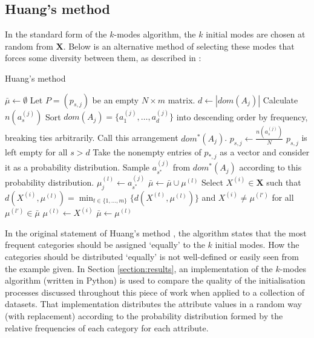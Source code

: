 \documentclass{article}
\theoremstyle{definition}
\begin{document}
\subsection{Huang's method}\label{subsection:huang}

In the standard form of the $k$-modes algorithm, the $k$ initial modes are 
chosen at random from $\textbf{X}$. Below is an alternative method of selecting
these modes that forces some diversity between them, as described in 
\cite{Huang98}:

\begin{algorithm}[H]
\caption{Huang's method}\label{alg:huang}
	\begin{algorithmic}[0]
		\State $\bar{\mu} \gets \emptyset$
		\State Let $P = (p_{s,j})$ be an empty $N \times m$ matrix.
			\State $d \gets |dom(A_j)|$
				\State Calculate $n(a_s^{(j)})$
			\EndFor
			\State Sort $dom(A_j) = \{a_1^{(j)}, \ldots, 
				a_d^{(j)}\}$ into descending order by frequency,
				breaking ties arbitrarily.
			\State Call this arrangement $dom^*(A_j)$.
				\State $p_{s,j} \gets \frac{n(a_s^{(j)})}{N}$
			\EndFor
			\State $p_{s,j}$ is left empty for all $s > d$
		\EndFor
				\State Take the nonempty entries of $p_{*,j}$ 
					as a vector and consider it as a 
					probability distribution.
				\State Sample $a_{s^*}^{(j)}$ from $dom^*(A_j)$
					according to this probability 
					distribution.
				\State $\mu_j^{(l)} \gets a_{s^*}^{(j)}$
			\EndFor
			\State $\bar{\mu} \gets \bar{\mu} \cup \mu^{(l)}$
		\EndFor
			\State Select $X^{(i)} \in \textbf{X}$ such that 
				$d(X^{(i)}, \mu^{(l)}) = \min_{t \in \{1, 
				\ldots, m\}} \{d(X^{(t)}, \mu^{(l)})\}$ and 
				$X^{(i)} \ne \mu^{(l')}$ for all $\mu^{(l')} 
				\in \bar{\mu}$
			\State $\mu^{(l)} \gets X^{(i)}$
			\State $\bar{\mu} \gets \mu^{(l)}$
		\EndFor
	\end{algorithmic}
\end{algorithm} 

In the original statement of Huang's method \cite{Huang98}, the algorithm states
that the most frequent categories should be assigned `equally' to the $k$ 
initial modes. How the categories should be distributed `equally' is not 
well-defined or easily seen from the example given. In Section 
\ref{section:results}, an implementation of the $k$-modes algorithm (written in
Python) is used to compare the quality of the initialisation processes discussed
throughout this piece of work when applied to a collection of datasets. That 
implementation distributes the attribute values in a random way (with 
replacement) according to the probability distribution formed by the relative 
frequencies of each category for each attribute. \\
	
\end{document}

